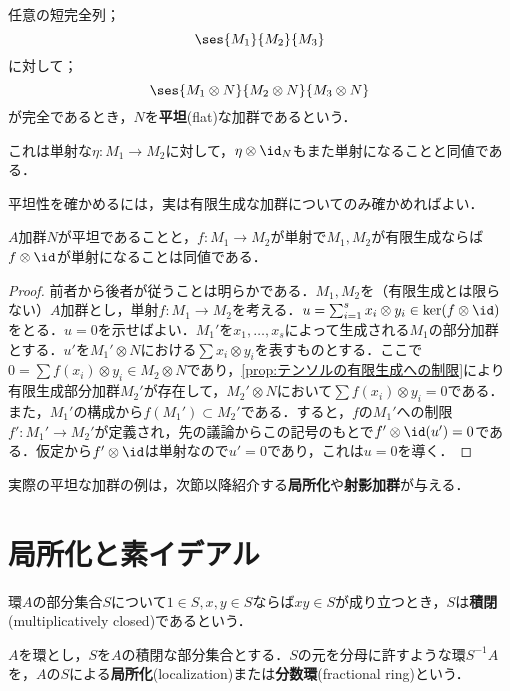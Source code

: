 \begin{defi}[平坦加群]
	任意の短完全列；
	\[\ses{M_1}{M_2}{M_3}\]
	に対して；
	\[\ses{M_1\otimes N}{M_2\otimes N}{M_3\otimes N}\]
	が完全であるとき，$N$を\textbf{平坦}(flat)な加群であるという．
\end{defi}

これは単射な$\eta:M_1\to M_2$に対して，$\eta\otimes\id_{N}$もまた単射になることと同値である．

平坦性を確かめるには，実は有限生成な加群についてのみ確かめればよい．

\begin{prop}\label{prop:平坦性は有限生成を調べればよい}
	$A$加群$N$が平坦であることと，$f:M_1\to M_2$が単射で$M_1,M_2$が有限生成ならば$f\otimes\id$が単射になることは同値である．
\end{prop}

\begin{proof}
	前者から後者が従うことは明らかである．$M_1,M_2$を（有限生成とは限らない）$A$加群とし，単射$f:M_1\to M_2$を考える．$u=\sum_{i=1}^s x_i\otimes y_i\in\ker(f\otimes\id)$をとる．$u=0$を示せばよい．$M_1'$を$x_1,\dots,x_s$によって生成される$M_1$の部分加群とする．$u'$を$M_1'\otimes N$における$\sum x_i\otimes y_i$を表すものとする．ここで$0=\sum f(x_i)\otimes y_i\in M_2\otimes N$であり，\ref{prop:テンソルの有限生成への制限}により有限生成部分加群$M_2'$が存在して，$M_2'\otimes N$において$\sum f(x_i)\otimes y_i=0$である．また，$M_1'$の構成から$f(M_1')\subset M_2'$である．すると，$f$の$M_1'$への制限$f':M_1'\to M_2'$が定義され，先の議論からこの記号のもとで$f'\otimes\id(u')=0$である．仮定から$f'\otimes\id$は単射なので$u'=0$であり，これは$u=0$を導く．
\end{proof}

実際の平坦な加群の例は，次節以降紹介する\textbf{局所化}や\textbf{射影加群}が与える．

\section{局所化と素イデアル}

\begin{defi}[積閉集合]
	環$A$の部分集合$S$について$1\in S,x,y\in S$ならば$xy\in S$が成り立つとき，$S$は\textbf{積閉}(multiplicatively closed)であるという．
\end{defi}

\begin{defi}[局所化]
	$A$を環とし，$S$を$A$の積閉な部分集合とする．$S$の元を分母に許すような環$S^{-1}A$を，$A$の$S$による\textbf{局所化}(localization)または\textbf{分数環}(fractional ring)という．
\end{defi}

